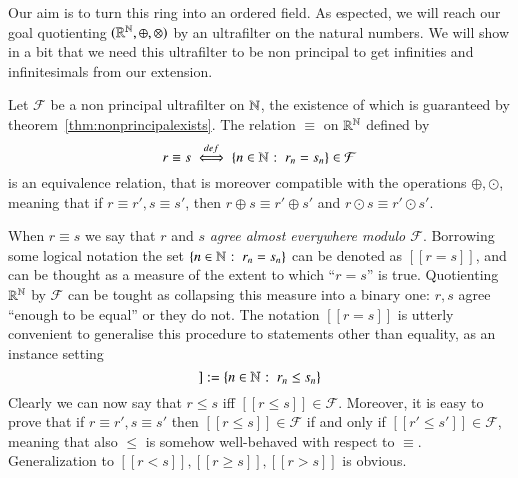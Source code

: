 \documentclass[adraft, copyright,creativecommons,sharealike,noncommercial]{Preambles/eptcs}
\begin{document}
Our aim is to turn this ring into an ordered field. As espected, we will reach our goal quotienting $(\mathbb{R}^{\mathbb{N}}, \oplus, \otimes)$ by an ultrafilter on the natural numbers. We will show in a bit that we need this ultrafilter to be non principal to get infinities and infinitesimals from our extension.
\begin{lemma}
	Let $\mathcal{F}$ be a non principal ultrafilter on $\mathbb{N}$, the existence of which is guaranteed by theorem~\ref{thm:nonprincipalexists}. The relation $\equiv$ on $\mathbb{R}^{\mathbb{N}}$ defined by
	\begin{equation*}
		r \equiv s \stackrel{def}{\iff} \left\{n \in \mathbb{N} \: \colon \: r_n = s_n\right\} \in \mathcal{F}
	\end{equation*}
	is an equivalence relation, that is moreover compatible with the operations $\oplus, \odot$, meaning that if $r \equiv r', s \equiv s'$, then $r \oplus s \equiv r' \oplus s'$ and $r \odot s \equiv r' \odot s'$. 
\end{lemma}
When $r \equiv s$ we say that $r$ and $s$ \emph{agree almost everywhere modulo $\mathcal{F}$}. Borrowing some logical notation the set $\left\{n \in \mathbb{N} \: \colon \: r_n = s_n\right\}$ can be denoted as $[[r = s]]$, and can be thought as a measure of the extent to which ``$r=s$'' is true. Quotienting $\mathbb{R}^{\mathbb{N}}$ by $\mathcal{F}$ can be tought as collapsing this measure into a binary one: $r, s$ agree ``enough to be equal'' or they do not. The notation $[[r = s]]$ is utterly convenient to generalise this procedure to statements other than equality, as an instance setting
\begin{equation*}
	[[r \leq s]] := \suchthat{n \in \naturals}{r_n \leq s_n}
\end{equation*}
Clearly we can now say that $r \leq s$ iff $[[r \leq s]] \in \mathcal{F}$. Moreover, it is easy to prove that if $r \equiv r', s \equiv s'$ then $[[r \leq s]] \in \mathcal{F}$ if and only if $[[r' \leq s']] \in \mathcal{F}$, meaning that also $\leq$ is somehow well-behaved with respect to $\equiv$. Generalization to $[[r < s]], [[r \geq s]], [[r > s]]$ is obvious. 
\end{document}
